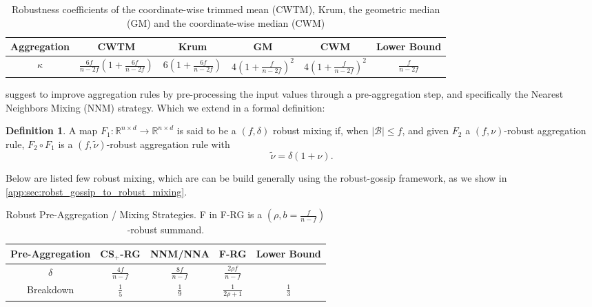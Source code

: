 \documentclass{article}
\newcommand{\R}{\mathbb{R}}
\newcommand{\cB}{\mathcal{B}}
\theoremstyle{plain}
\theoremstyle{definition}
\newtheorem{definition}[theorem]{Definition}
\theoremstyle{remark}
\begin{document}
\begin{table}[h]
    \centering
    \renewcommand{\arraystretch}{1.2}
    \begin{tabular}{c c c c c | c}
    \toprule
         Aggregation &  CWTM & Krum & GM & CWM & Lower Bound\\ %
    \midrule
         $\kappa$ & $\frac{6f}{n-2f}\left(1 + \frac{6f}{n-2f}\right)$ & $6\left(1 + \frac{6f}{n-2f}\right)$ & $4\left(1 + \frac{f}{n-2f}\right)^2$ & $4\left(1 + \frac{f}{n-2f}\right)^2$ & $\frac{f}{n-2f}$\\ %
    \bottomrule
         
    \end{tabular}
    \caption{Robustness coefficients of the coordinate-wise trimmed mean (CWTM), Krum, the geometric median (GM) and the coordinate-wise median (CWM)}
\end{table}

\citet{allouah2023fixing} suggest to improve aggregation rules by pre-processing the input values through a pre-aggregation step, and specifically the Nearest Neighbors Mixing (NNM) strategy. Which we extend in a formal definition:
\begin{definition}
    A map $F_1:\R^{n\times d} \rightarrow \R^{n\times d}$ is said to be a $(f, \delta)$ robust mixing if, when $|\cB| \le f$, and given $F_2$ a $(f,\nu)$-robust aggregation rule, $F_2 \circ F_1$ is a $(f, \tilde \nu)$-robust aggregation rule with
    \[
    \tilde \nu = \delta (1 + \nu).
    \]
\end{definition}
Below are listed few robust mixing, which are can be build generally using the robust-gossip framework, as we show in \cref{app:sec:robst_gossip_to_robust_mixing}.

\begin{table}[h]
    \centering
    \renewcommand{\arraystretch}{1.2}
    \begin{tabular}{c c c c | c}
        \toprule
         Pre-Aggregation & CS$_+$-RG & NNM/NNA & F-RG  & Lower Bound\\
         \midrule
         $\delta$ &   $\frac{4f}{n-f}$ & $\frac{8f}{n-f}$  & $\frac{2\rho f}{n-f}$&  \\
         Breakdown & $\frac{1}{5}$ & $\frac{1}{9}$ & $\frac{1}{2\rho + 1}$ &  $\frac{1}{3}$ \\
         \bottomrule
    \end{tabular}
    \caption{Robust Pre-Aggregation / Mixing Strategies. F in F-RG is a $(\rho, b=\frac{f}{n-f})$-robust summand. }
\end{table}
\end{document}
